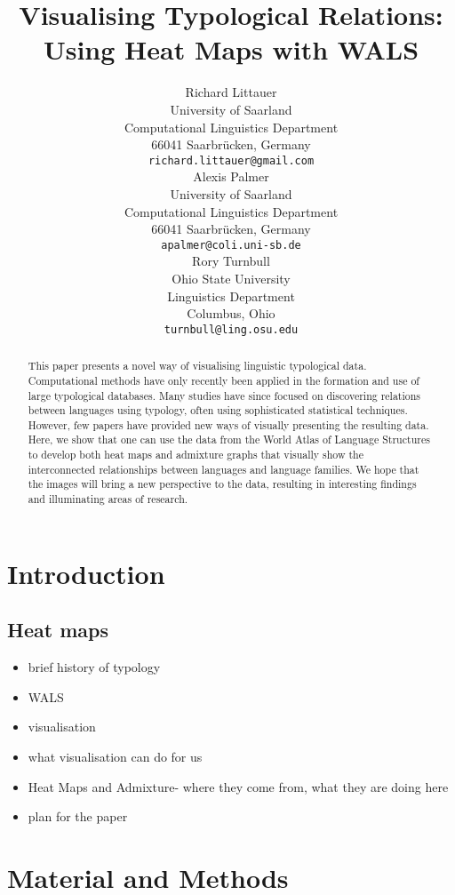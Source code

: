 \documentclass[11pt]{article}
\title{Visualising Typological Relations: Using Heat Maps with WALS}
\author{Richard Littauer \\
University of Saarland\\
Computational Linguistics Department\\
66041 Saarbr\"ucken, Germany\\
  {\tt richard.littauer@gmail.com} \\\And
Alexis Palmer\\
University of Saarland\\
Computational Linguistics Department\\
66041 Saarbr\"ucken, Germany\\
  {\tt apalmer@coli.uni-sb.de} \\\And
Rory Turnbull \\
Ohio State University\\
Linguistics Department\\
Columbus, Ohio\\
  {\tt turnbull@ling.osu.edu} \\}
\date{}
\begin{document}
\maketitle
\begin{abstract}
This paper presents a novel way of visualising linguistic typological data. Computational methods have only recently been applied in the formation and use of large typological databases. Many studies have since focused on discovering relations between languages using typology, often using sophisticated statistical techniques. However, few papers have provided new ways of visually presenting the resulting data. Here, we show that one can use the data from the World Atlas of Language Structures\cite{wals-2011} to develop both heat maps and admixture graphs that visually show the interconnected relationships between languages and language families. We hope that the images will bring a new perspective to the data, resulting in interesting findings and illuminating areas of research.
\end{abstract}


\section{Introduction}
\subsection{Heat maps}
\begin{itemize}
\item brief history of typology
\item WALS
\item visualisation
\item what visualisation can do for us
\item Heat Maps and Admixture-  where they come from, what they are doing here
\item plan for the paper
\end{itemize}

\section{Material and Methods}
\end{document}
